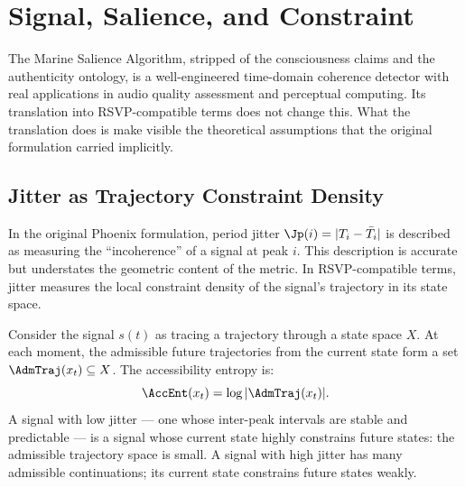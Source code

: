 
\chapter{Signal, Salience, and Constraint}
\label{ch:signal-salience-constraint}


\noindent
The Marine Salience Algorithm, stripped of the
consciousness claims and the authenticity ontology,
is a well-engineered time-domain coherence detector
with real applications in audio quality assessment
and perceptual computing. Its translation into
RSVP-compatible terms does not change this. What
the translation does is make visible the theoretical
assumptions that the original formulation carried
implicitly.

\section{Jitter as Trajectory Constraint Density}
\label{sec:jitter-trajectory}

In the original Phoenix formulation, period jitter
$\Jp(i) = |T_i - \bar{T}_i|$ is described as
measuring the ``incoherence'' of a signal at peak $i$.
This description is accurate but understates the
geometric content of the metric. In RSVP-compatible
terms, jitter measures the local constraint density
of the signal's trajectory in its state space.

Consider the signal $s(t)$ as tracing a trajectory
through a state space $X$. At each moment, the
admissible future trajectories from the current state
form a set $\AdmTraj(x_t) \subseteq X$. The
accessibility entropy is:
\[
  \AccEnt(x_t) = \log |\AdmTraj(x_t)|.
\]
A signal with low jitter --- one whose inter-peak
intervals are stable and predictable --- is a signal
whose current state highly constrains future states:
the admissible trajectory space is small. A signal
with high jitter has many admissible continuations;
its current state constrains future states weakly.

